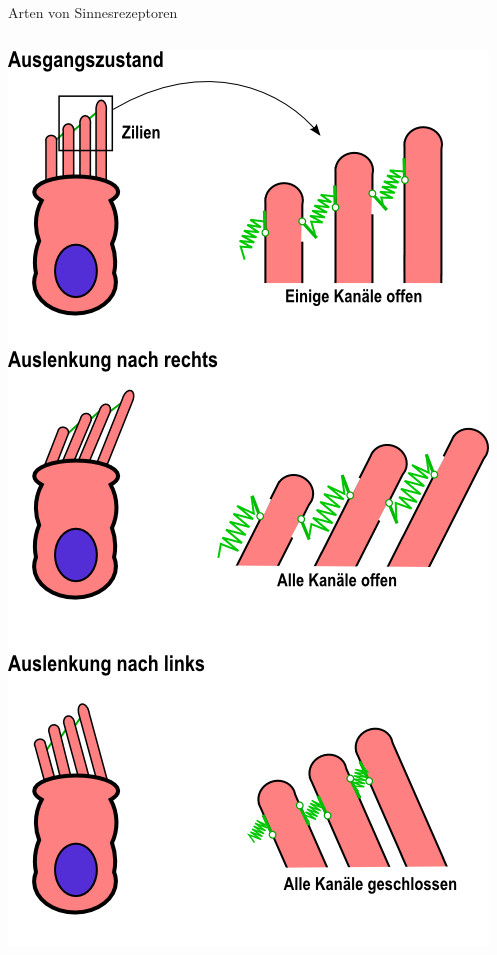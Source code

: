 \documentclass{beamer}
\begin{document}
\begin{frame}{Arten von Sinnesrezeptoren}
\begin{columns}[c]
\begin{column}{4cm}
\includegraphics[width=\textwidth]{Haarzelle.png}
\end{column}


\end{columns}


\end{frame} 
\end{document}

